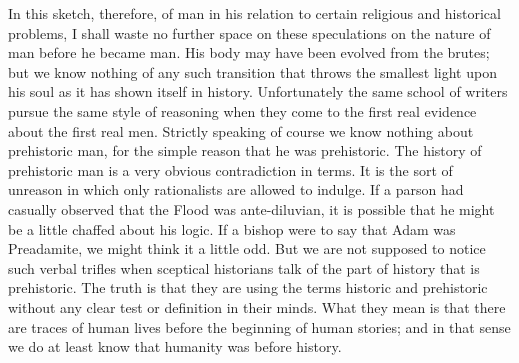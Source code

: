 In this sketch, therefore, of man in his relation to certain religious and historical problems, I shall waste no further space on these speculations on the nature of man before he became man. His body may have been evolved from the brutes; but we know nothing of any such transition that throws the smallest light upon his soul as it has shown itself in history. Unfortunately the same school of writers pursue the same style of reasoning when they come to the first real evidence about the first real men. Strictly speaking of course we know nothing about prehistoric man, for the simple reason that he was prehistoric. The history of prehistoric man is a very obvious contradiction in terms. It is the sort of unreason in which only rationalists are allowed to indulge. If a parson had casually observed that the Flood was ante-diluvian, it is possible that he might be a little chaffed about his logic. If a bishop were to say that Adam was Preadamite, we might think it a little odd. But we are not supposed to notice such verbal trifles when sceptical historians talk of the part of history that is prehistoric. The truth is that they are using the terms historic and prehistoric without any clear test or definition in their minds. What they mean is that there are traces of human lives before the beginning of human stories; and in that sense we do at least know that humanity was before history.

